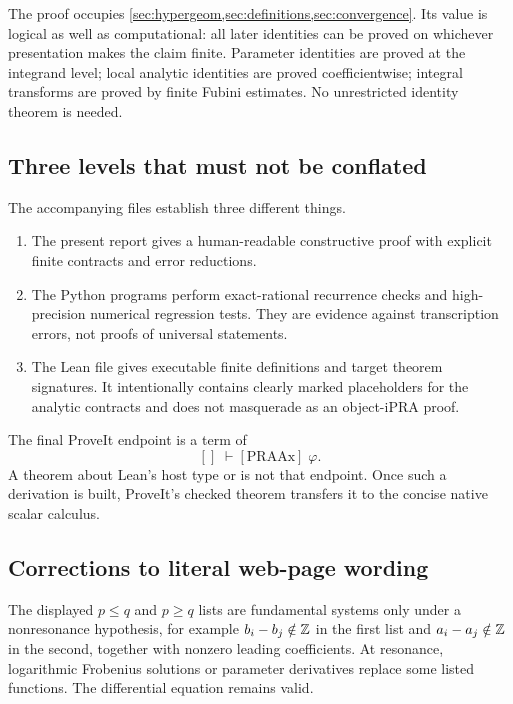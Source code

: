 The proof occupies \cref{sec:hypergeom,sec:definitions,sec:convergence}.  Its
value is logical as well as computational: all later identities can be proved
on whichever presentation makes the claim finite.  Parameter identities are
proved at the integrand level; local analytic identities are proved
coefficientwise; integral transforms are proved by finite Fubini estimates.
No unrestricted identity theorem is needed.

\subsection{Three levels that must not be conflated}

The accompanying files establish three different things.
\begin{enumerate}
\item The present report gives a human-readable constructive proof with explicit
      finite contracts and error reductions.
\item The Python programs perform exact-rational recurrence checks and
      high-precision numerical regression tests.  They are evidence against
      transcription errors, not proofs of universal statements.
\item The Lean file gives executable finite definitions and target theorem
      signatures.  It intentionally contains clearly marked placeholders for
      the analytic contracts and does not masquerade as an object-iPRA proof.
\end{enumerate}
The final ProveIt endpoint is a term of
\[
 []\;\vdash[\mathrm{PRAAx}]\;\varphi.
\]
A theorem about Lean's host type  or  is not that
endpoint.  Once such a derivation is built, ProveIt's checked theorem
 transfers it to the concise native scalar calculus.

\subsection{Corrections to literal web-page wording}

\begin{audit}
The displayed $p\le q$ and $p\ge q$ lists are fundamental systems only under a
nonresonance hypothesis, for example $b_i-b_j\notin\mathbb Z$ in the first list and
$a_i-a_j\notin\mathbb Z$ in the second, together with nonzero leading coefficients.
At resonance, logarithmic Frobenius solutions or parameter derivatives replace
some listed functions.  The differential equation remains valid.
\end{audit}

